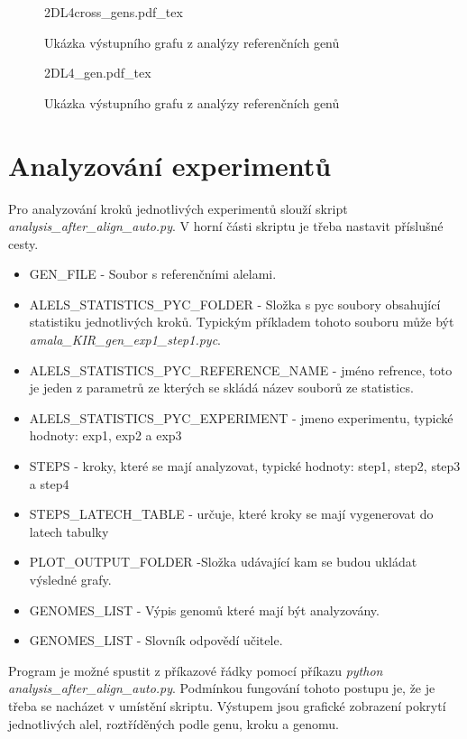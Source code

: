 \documentclass[czech,DP]{thesiskiv}
\numberwithin{equation}{section}
\begin{document}
\begin{figure}[H]
    \centering
    \def\svgwidth{\columnwidth}
    {2DL4cross_gens.pdf_tex} 
    \caption{Ukázka výstupního grafu z analýzy referenčních genů}
\end{figure}

\begin{figure}[H]
    \centering
    \def\svgwidth{\columnwidth}
    {2DL4_gen.pdf_tex} 
    \caption{Ukázka výstupního grafu z analýzy referenčních genů}
\end{figure}


\section{Analyzování experimentů}
Pro analyzování kroků jednotlivých experimentů slouží skript \textit{analysis\_after\_align\_auto.py}. V horní části skriptu je třeba nastavit příslušné cesty. 

\begin{itemize}
	\item GEN\_FILE - Soubor s referenčními alelami.
	\item ALELS\_STATISTICS\_PYC\_FOLDER - Složka s pyc soubory obsahující statistiku jednotlivých kroků. Typickým příkladem tohoto souboru může být \textit{amala\_KIR\_gen\_exp1\_step1.pyc}.
	\item ALELS\_STATISTICS\_PYC\_REFERENCE\_NAME - jméno refrence, toto je jeden z parametrů ze kterých se skládá název souborů ze statistics.
	\item ALELS\_STATISTICS\_PYC\_EXPERIMENT - jmeno experimentu, typické hodnoty: exp1, exp2 a exp3
	\item STEPS - kroky, které se mají analyzovat, typické hodnoty: step1, step2, step3 a step4
	\item STEPS\_LATECH\_TABLE  - určuje, které kroky se mají vygenerovat do latech tabulky
	\item PLOT\_OUTPUT\_FOLDER -Složka udávající kam se budou ukládat výsledné grafy.
	\item GENOMES\_LIST - Výpis genomů které mají být analyzovány.
	\item GENOMES\_LIST - Slovník odpovědí učitele.
\end{itemize}

\noindent
Program je možné spustit z příkazové řádky pomocí příkazu \textit{python analysis\_after\_align\_auto.py}. Podmínkou fungování tohoto postupu je, že je třeba se nacházet v umístění skriptu. Výstupem jsou grafické zobrazení pokrytí jednotlivých alel, roztříděných podle genu, kroku a genomu.
\end{document}
